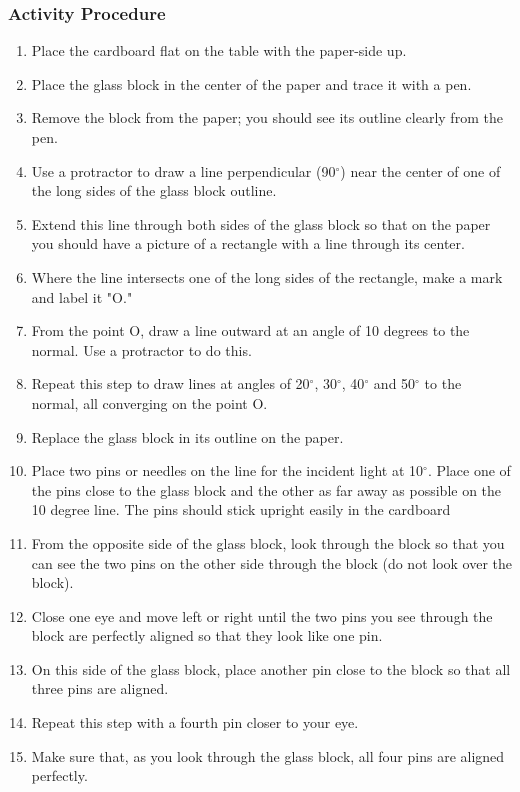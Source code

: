 \subsubsection*{Activity Procedure}
\begin{enumerate}
\item{Place the cardboard flat on the table with the paper-side up.} 
\item{Place the glass block in the center of the paper and trace it with a pen.} 
\item{Remove the block from the paper; you should see its outline clearly from the pen.} 
\item{Use a protractor to draw a line perpendicular (90$^{\circ}$) near the center of one of the long sides of the glass block outline.} 
\item{Extend this line through both sides of the glass block so that on the paper you should have a picture of a rectangle with a line through its center.} 
\item{Where the line intersects one of the long sides of the rectangle, make a mark and label it "O."}
\item{From the point O, draw a line outward at an angle of 10 degrees to the normal. Use a protractor to do this.} 
\item{Repeat this step to draw lines at angles of 20$^{\circ}$, 30$^{\circ}$, 40$^{\circ}$ and 50$^{\circ}$ to the normal, all converging on the point O.} 
\item{Replace the glass block in its outline on the paper.} 
\item{Place two pins or needles on the line for the incident light at 10$^{\circ}$. Place one of the pins close to the glass block and the other as far away as possible on the 10 degree line. The pins should stick upright easily in the cardboard}
\item{From the opposite side of the glass block, look through the block so that you can see the two pins on the other side through the block (do not look over the block).} 
\item{Close one eye and move left or right until the two pins you see through the block are perfectly aligned so that they look like one pin.} 
\item{On this side of the glass block, place another pin close to the block so that all three pins are aligned.} 
\item{Repeat this step with a fourth pin closer to your eye.} 
\item{Make sure that, as you look through the glass block, all four pins are aligned perfectly.} 

\end{enumerate}
